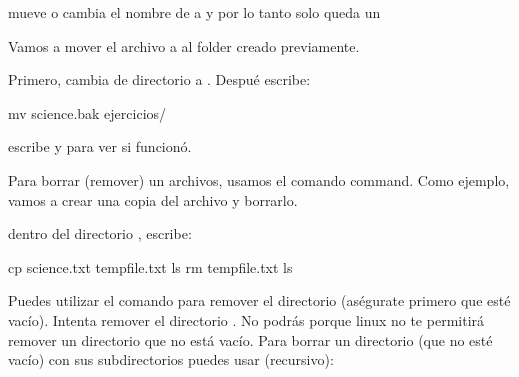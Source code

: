 \documentclass[letterpaper,10pt,english]{jupyterBook}
\begin{document}
\sphinxAtStartPar
{}

\sphinxAtStartPar
{} mueve o cambia el nombre de  a  y por lo tanto solo queda un

\sphinxAtStartPar
Vamos a mover el archivo  a al folder  creado previamente.

\sphinxAtStartPar
Primero, cambia de directorio a . Despué escribe:

\begin{sphinxVerbatim}[commandchars=\\\{\}]
\PYGZdl{} mv science.bak ejercicios/
\end{sphinxVerbatim}

\sphinxAtStartPar
escribe  y  para ver si funcionó.

\begin{DUlineblock}{0em}
\item[] 
\end{DUlineblock}

\sphinxAtStartPar
{}

\sphinxAtStartPar
Para borrar (remover) un archivos, usamos el comando  command. Como ejemplo, vamos a crear una copia del archivo  y borrarlo.

\sphinxAtStartPar
dentro del directorio , escribe:

\begin{sphinxVerbatim}[commandchars=\\\{\}]
\PYGZdl{} cp science.txt tempfile.txt 
\PYGZdl{} ls
\PYGZdl{} rm tempfile.txt
\PYGZdl{} ls
\end{sphinxVerbatim}

\sphinxAtStartPar
Puedes utilizar el comando  para remover el directorio (aségurate primero que esté vacío). Intenta remover el directorio . No podrás porque linux no te permitirá remover un directorio que no está vacío. Para borrar un directorio (que no esté vacío) con sus subdirectorios puedes usar  (recursivo):
\end{document}
